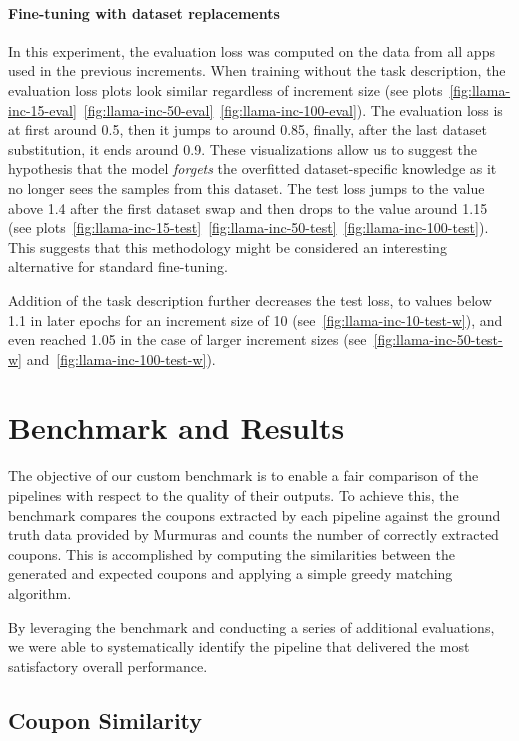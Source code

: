 \documentclass[licencjacka,en]{pracamgr}
\begin{document}
\subsubsection{Fine-tuning with dataset replacements}
In this experiment, the evaluation loss was computed on the data from all apps used in the previous increments.
When training without the task description, the evaluation loss plots look similar regardless of increment size (see plots~\ref{fig:llama-inc-15-eval}~\ref{fig:llama-inc-50-eval}~\ref{fig:llama-inc-100-eval}). The evaluation loss is at first around 0.5, then it jumps to around 0.85, finally, after the last dataset substitution, it ends around 0.9. These visualizations allow us to suggest the hypothesis that the model \emph{forgets} the overfitted dataset-specific knowledge as it no longer sees the samples from this dataset. The test loss jumps to the value above 1.4 after the first dataset swap and then drops to the value around 1.15 (see plots~\ref{fig:llama-inc-15-test}~\ref{fig:llama-inc-50-test}~\ref{fig:llama-inc-100-test}). This suggests that this methodology might be considered an interesting alternative for standard fine-tuning.

Addition of the task description further decreases the test loss, to values below 1.1 in later epochs for an increment size of 10 (see~\ref{fig:llama-inc-10-test-w}), and even reached 1.05 in the case of larger increment sizes (see~\ref{fig:llama-inc-50-test-w} and~\ref{fig:llama-inc-100-test-w}).

\chapter{Benchmark and Results} \label{chap:benchmark}

The objective of our custom benchmark is to enable a fair comparison of the pipelines with respect to the quality of their outputs. To achieve this, the benchmark compares the coupons extracted by each pipeline against the ground truth data provided by Murmuras and counts the number of correctly extracted coupons. This is accomplished by computing the similarities between the generated and expected coupons and applying a simple greedy matching algorithm.

By leveraging the benchmark and conducting a series of additional evaluations, we were able to systematically identify the pipeline that delivered the most satisfactory overall performance.

\section{Coupon Similarity}
\end{document}
